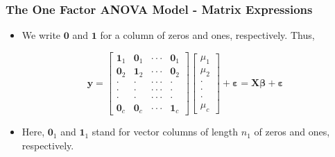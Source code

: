    \begin{frame}%
 \frametitle{The One Factor ANOVA Model - Matrix Expressions}
   \begin{itemize}
    \item We write $\mathbf{0}$ and
$\mathbf{1}$ for a column of zeros and ones, respectively. Thus,

\begin{equation*}
\mathbf{y}=%
\begin{bmatrix}
\mathbf{1}_1 & \mathbf{0}_1 & \cdot \cdot \cdot  & \mathbf{0}%
_{1} \\
\mathbf{0}_{2} & \mathbf{1}_2 & \cdot \cdot \cdot  & \mathbf{0}%
_{2} \\
\cdot  & \cdot  & \cdot \cdot \cdot  & \cdot  \\
\cdot  & \cdot  & \cdot \cdot \cdot  & \cdot  \\
\cdot  & \cdot  & \cdot \cdot \cdot  & \cdot  \\
\mathbf{0}_c & \mathbf{0}_c & \cdot \cdot \cdot  & \mathbf{1}_c
\end{bmatrix}
\begin{bmatrix}
\mu _{1} \\
\mu _{2} \\
\cdot  \\
\cdot  \\
\cdot  \\
\mu _{c}%
\end{bmatrix}%
+\boldsymbol \varepsilon =\mathbf{X \boldsymbol \beta +\boldsymbol
\varepsilon }\text{ \ \ \ }
\end{equation*}
\item Here, $\mathbf{0}_{1}$ and $\mathbf{1}_{1}$ stand for
vector columns of length $n_{1}$ of zeros and ones, respectively.
                 \end{itemize}
    \end{frame}

